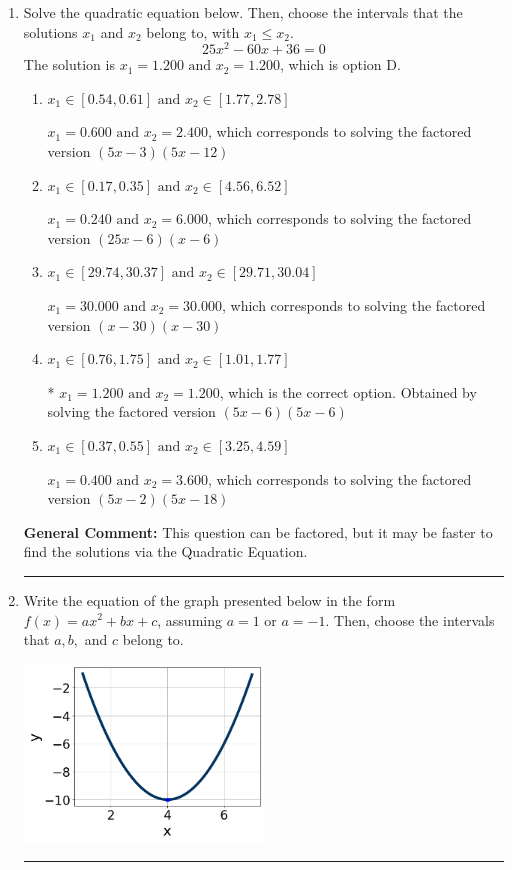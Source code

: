 \documentclass{extbook}[14pt]
\newcommand{\litem}[1]{\item #1

\rule{\textwidth}{0.4pt}}
\begin{document}
\begin{enumerate}\litem{
Solve the quadratic equation below. Then, choose the intervals that the solutions $x_1$ and $x_2$ belong to, with $x_1 \leq x_2$.
\[ 25x^{2} -60 x + 36 = 0 \]The solution is \( x_1 = 1.200 \text{ and } x_2 = 1.200 \), which is option D.\begin{enumerate}[label=\Alph*.]
\item \( x_1 \in [0.54, 0.61] \text{ and } x_2 \in [1.77, 2.78] \)

$x_1 = 0.600 \text{ and } x_2 = 2.400$, which corresponds to solving the factored version $(5x -3)(5x -12)$
\item \( x_1 \in [0.17, 0.35] \text{ and } x_2 \in [4.56, 6.52] \)

$x_1 = 0.240 \text{ and } x_2 = 6.000$, which corresponds to solving the factored version $(25x -6)(x -6)$
\item \( x_1 \in [29.74, 30.37] \text{ and } x_2 \in [29.71, 30.04] \)

$x_1 = 30.000 \text{ and } x_2 = 30.000$, which corresponds to solving the factored version $(x -30)(x -30)$
\item \( x_1 \in [0.76, 1.75] \text{ and } x_2 \in [1.01, 1.77] \)

* $x_1 = 1.200 \text{ and } x_2 = 1.200$, which is the correct option. Obtained by solving the factored version $(5x -6)(5x -6)$
\item \( x_1 \in [0.37, 0.55] \text{ and } x_2 \in [3.25, 4.59] \)

$x_1 = 0.400 \text{ and } x_2 = 3.600$, which corresponds to solving the factored version $(5x -2)(5x -18)$
\end{enumerate}

\textbf{General Comment:} This question can be factored, but it may be faster to find the solutions via the Quadratic Equation.
}
\litem{
Write the equation of the graph presented below in the form $f(x)=ax^2+bx+c$, assuming  $a=1$ or $a=-1$. Then, choose the intervals that $a, b,$ and $c$ belong to.

\begin{center}
    \includegraphics[width=0.5\textwidth]{../Figures/quadraticGraphToEquationC.png}
\end{center}


}
\end{enumerate}
\end{document}
